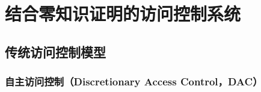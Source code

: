 
\chapter{结合零知识证明的访问控制系统}

\section{传统访问控制模型}

\subsection{自主访问控制（Discretionary Access Control，DAC）}
